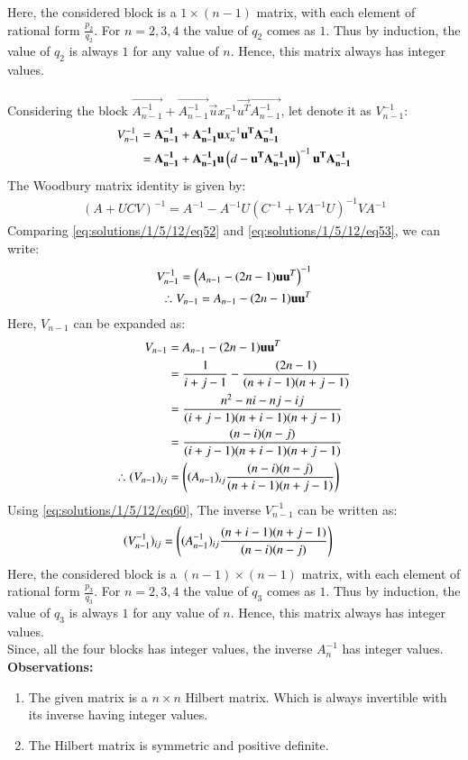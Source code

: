 Here, the considered block is a $1 \times (n-1)$ matrix, with each element of rational form $\frac{p_2}{q_2}$. For $n=2,3,4$ the value of $q_2$ comes as $1$. Thus by induction, the value of $q_2$ is always $1$ for any value of $n$. Hence, this matrix always has integer values. \\\\
Considering the block $\vec{A_{n-1}^{-1}}+\vec{A_{n-1}^{-1}}\vec{u}x_n^{-1}\vec{u^T}\vec{A_{n-1}^{-1}}$, let denote it as $V_{n-1}^{-1}$:
\begin{align}
    V_{n-1}^{-1}&=\mathbf{A_{n-1}^{-1}}+\mathbf{A_{n-1}^{-1}}\mathbf{u}x_n^{-1}\mathbf{u^T}\mathbf{A_{n-1}^{-1}}\\
    &=\mathbf{A_{n-1}^{-1}}+\mathbf{A_{n-1}^{-1}}\mathbf{u}\left(d-\mathbf{u^T}\mathbf{A_{n-1}^{-1}}\mathbf{u}\right)^{-1}\mathbf{u^T}\mathbf{A_{n-1}^{-1}} \label{eq:solutions/1/5/12/eq52}
\end{align}
The Woodbury matrix identity is given by:
\begin{align}
    \boxed{\left(A+UCV\right)^{-1}=A^{-1}-A^{-1}U\left(C^{-1}+VA^{-1}U\right)^{-1}VA^{-1}} \label{eq:solutions/1/5/12/eq53}
\end{align}
Comparing \eqref{eq:solutions/1/5/12/eq52} and \eqref{eq:solutions/1/5/12/eq53}, we can write:
\begin{align}
    V_{n-1}^{-1}=\left(A_{n-1}-(2n-1)\mathbf{u}\mathbf{u}^T\right)^{-1}\\
    \therefore  V_{n-1}=A_{n-1}-(2n-1)\mathbf{u}\mathbf{u}^T
\end{align}
Here, $V_{n-1}$ can be expanded as:
\begin{align}
    V_{n-1}&=A_{n-1}-(2n-1)\mathbf{u}\mathbf{u}^T\\
    &=\frac{1}{i+j-1}-\frac{(2n-1)}{(n+i-1)(n+j-1)}\\
    &=\frac{n^2-ni-nj-ij}{(i+j-1)(n+i-1)(n+j-1)}\\
    &=\frac{(n-i)(n-j)}{(i+j-1)(n+i-1)(n+j-1)}\\
    \therefore (V_{n-1})_{ij}&=\left((A_{n-1})_{ij}\frac{(n-i)(n-j)}{(n+i-1)(n+j-1)}\right) \label{eq:solutions/1/5/12/eq60}
\end{align}
Using \eqref{eq:solutions/1/5/12/eq60}, The inverse $V_{n-1}^{-1}$ can be written as:
\begin{align}
    (V_{n-1}^{-1})_{ij}&=\left((A_{n-1}^{-1})_{ij}\frac{(n+i-1)(n+j-1)}{(n-i)(n-j)}\right)
\end{align}
Here, the considered block is a $(n-1) \times (n-1)$ matrix, with each element of rational form $\frac{p_3}{q_3}$. For $n=2,3,4$ the value of $q_3$ comes as $1$. Thus by induction, the value of $q_3$ is always $1$ for any value of $n$. Hence, this matrix always has integer values.\\
Since, all the four blocks has integer values, the inverse $A_n^{-1}$ has integer values.
{\textbf{Observations:}} 
\begin{enumerate}
    \item The given matrix is a $n\times n$ Hilbert matrix. Which is always invertible with its inverse having integer values.
    \item The Hilbert matrix is symmetric and positive definite.
\end{enumerate}
